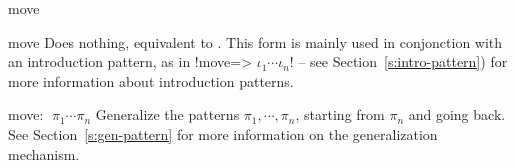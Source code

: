 \begin{tactic}{move}
  \begin{tsyntax}{move}
     Does nothing, equivalent to . This form is mainly
     used in conjonction with an introduction pattern, as in
     \ls!move=> $\iota_1 \cdots \iota_n$! -- see Section~\ref{s:intro-pattern})
     for more information about introduction patterns.
  \end{tsyntax}

  \begin{tsyntax}{move: $\;\pi_1 \cdots \pi_n$}
    Generalize the patterns $\pi_1, \cdots, \pi_n$, starting from
    $\pi_n$ and going back. See Section~\ref{s:gen-pattern} for more
    information on the generalization mechanism.
  \end{tsyntax}
\end{tactic}
